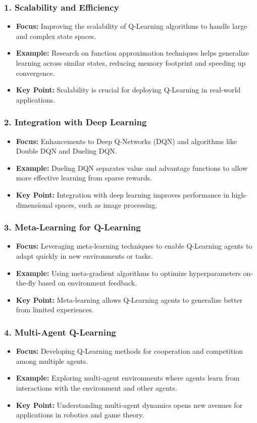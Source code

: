 \documentclass[aspectratio=169]{beamer}
\begin{document}
\begin{frame}[fragile]
    \frametitle{1. Scalability and Efficiency}
    \begin{itemize}
        \item \textbf{Focus:} Improving the scalability of Q-Learning algorithms to handle large and complex state spaces.
        \item \textbf{Example:} Research on function approximation techniques helps generalize learning across similar states, reducing memory footprint and speeding up convergence.
        \item \textbf{Key Point:} Scalability is crucial for deploying Q-Learning in real-world applications.
    \end{itemize}
\end{frame}

\begin{frame}[fragile]
    \frametitle{2. Integration with Deep Learning}
    \begin{itemize}
        \item \textbf{Focus:} Enhancements to Deep Q-Networks (DQN) and algorithms like Double DQN and Dueling DQN.
        \item \textbf{Example:} Dueling DQN separates value and advantage functions to allow more effective learning from sparse rewards.
        \item \textbf{Key Point:} Integration with deep learning improves performance in high-dimensional spaces, such as image processing.
    \end{itemize}
\end{frame}

\begin{frame}[fragile]
    \frametitle{3. Meta-Learning for Q-Learning}
    \begin{itemize}
        \item \textbf{Focus:} Leveraging meta-learning techniques to enable Q-Learning agents to adapt quickly in new environments or tasks.
        \item \textbf{Example:} Using meta-gradient algorithms to optimize hyperparameters on-the-fly based on environment feedback.
        \item \textbf{Key Point:} Meta-learning allows Q-Learning agents to generalize better from limited experiences.
    \end{itemize}
\end{frame}

\begin{frame}[fragile]
    \frametitle{4. Multi-Agent Q-Learning}
    \begin{itemize}
        \item \textbf{Focus:} Developing Q-Learning methods for cooperation and competition among multiple agents.
        \item \textbf{Example:} Exploring multi-agent environments where agents learn from interactions with the environment and other agents.
        \item \textbf{Key Point:} Understanding multi-agent dynamics opens new avenues for applications in robotics and game theory.
    \end{itemize}
\end{frame}
\end{document}

